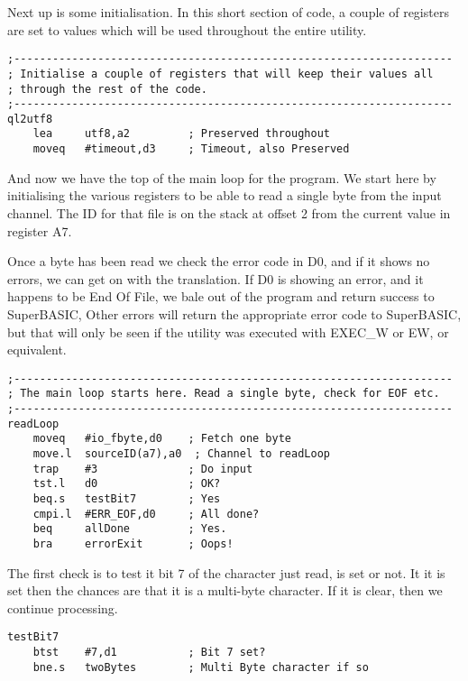 Next up is some initialisation. In this short section of code, a couple
of registers are set to values which will be used throughout the entire
utility.

\begin{lstlisting}
;--------------------------------------------------------------------
; Initialise a couple of registers that will keep their values all
; through the rest of the code.
;--------------------------------------------------------------------
ql2utf8
    lea     utf8,a2         ; Preserved throughout
    moveq   #timeout,d3     ; Timeout, also Preserved

\end{lstlisting}

And now we have the top of the main loop for the program. We start
here by initialising the various registers to be able to read a single
byte from the input channel. The ID for that file is on the stack
at offset 2 from the current value in register A7.

Once a byte has been read we check the error code in D0, and if it
shows no errors, we can get on with the translation. If D0 is showing
an error, and it happens to be End Of File, we bale out of the program
and return success to SuperBASIC, Other errors will return the appropriate
error code to SuperBASIC, but that will only be seen if the utility
was executed with EXEC\_W or EW, or equivalent.

\begin{lstlisting}
;--------------------------------------------------------------------
; The main loop starts here. Read a single byte, check for EOF etc.
;--------------------------------------------------------------------
readLoop
    moveq   #io_fbyte,d0    ; Fetch one byte
    move.l  sourceID(a7),a0  ; Channel to readLoop
    trap    #3              ; Do input
    tst.l   d0              ; OK?
    beq.s   testBit7        ; Yes
    cmpi.l  #ERR_EOF,d0     ; All done?
    beq     allDone         ; Yes.
    bra     errorExit       ; Oops!
\end{lstlisting}

The first check is to test it bit 7 of the character just read, is
set or not. It it is set then the chances are that it is a multi-byte
character. If it is clear, then we continue processing.

\begin{lstlisting}
testBit7
    btst    #7,d1           ; Bit 7 set?
    bne.s   twoBytes        ; Multi Byte character if so
\end{lstlisting}

